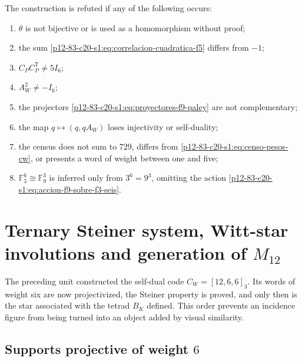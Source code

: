 \begin{criterion}
The construction is refuted if any of the following occurs:
\begin{enumerate}
 \item \(\theta\) is not bijective or is used as a homomorphism without proof;
 \item the sum \eqref{p12-83-c20-s1:eq:correlacion-cuadratica-f5} differs from \(-1\);
 \item \(C_PC_P^{\mathsf T}\neq5I_6\);
 \item \(A_W^2\neq-I_6\);
 \item the projectors \eqref{p12-83-c20-s1:eq:proyectores-f9-paley} are not
       complementary;
 \item the map \(q\mapsto(q,qA_W)\) loses injectivity or
       self-duality;
 \item the census does not sum to \(729\), differs from
       \eqref{p12-83-c20-s1:eq:censo-pesos-cw}, or presents a word of weight between one
       and five;
 \item \(\mathbb F_3^6\cong\mathbb F_9^3\) is inferred only from
       \(3^6=9^3\), omitting the action \eqref{p12-83-c20-s1:eq:accion-f9-sobre-f3-seis}.
\end{enumerate}
\end{criterion}



\section{Ternary Steiner system, Witt-star involutions and generation of \texorpdfstring{\(M_{12}\)}{M12}}
\label{p12-83-c20-s2:chap:sistema-witt-estrellas-m12}

The preceding unit constructed the self-dual code
\(C_W=[12,6,6]_3\). Its words of weight six are now projectivized,
the Steiner property is proved, and only then is the star
associated with the tetrad \(B_K\) defined. This order prevents an incidence
figure from being turned into an object added by visual similarity.

\subsection{Supports projective of weight \(6\)}

